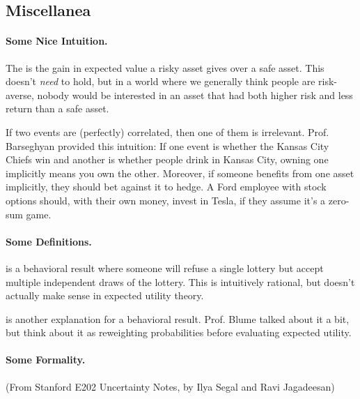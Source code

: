\documentclass[12pt]{article}
\begin{document}
\subsection{Miscellanea}

\paragraph{Some Nice Intuition.}


\begin{definition}
	The  is the gain in expected value a risky asset gives over a safe asset. This doesn't \emph{need} to hold, but in a world where we generally think people are risk-averse, nobody would be interested in an asset that had both higher risk and less return than a safe asset. 
\end{definition}

\begin{remark}
	If two events are (perfectly) correlated, then one of them is irrelevant. Prof. Barseghyan provided this intuition: If one event is whether the Kansas City Chiefs win and another is whether people drink in Kansas City, owning one implicitly means you own the other. Moreover, if someone benefits from one asset implicitly, they should bet against it to hedge. A Ford employee with stock options should, with their own money, invest in Tesla, if they assume it's a zero-sum game.
\end{remark}


\paragraph{Some Definitions.} 

\begin{definition}
	 is a behavioral result where someone will refuse a single lottery but accept multiple independent draws of the lottery. This is intuitively rational, but doesn't actually make sense in expected utility theory.
\end{definition}
\begin{definition}
	 is another explanation for a behavioral result. Prof. Blume talked about it a bit, but think about it as reweighting probabilities before evaluating expected utility.
\end{definition}

\paragraph{Some Formality.} (From Stanford E202 Uncertainty Notes, by Ilya Segal and Ravi Jagadeesan)
\end{document}
